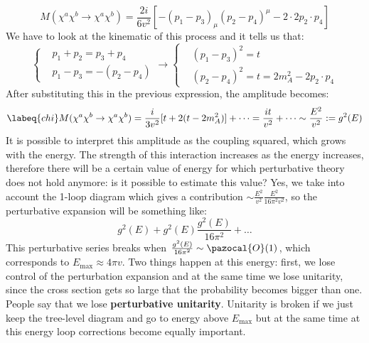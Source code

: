 \documentclass[../main.tex]{subfiles}
\begin{document}
\[
M(\chi^a\chi^b\to\chi^a\chi^b)=\frac{2i}{6v^2}[-(p_1-p_3)_\mu(p_2-p_4)^\mu-2\cdot2p_2\cdot p_4]
\]
We have to look at the kinematic of this process and it tells us that:
\[
\left\{
\begin{aligned}
&p_1+p_2=p_3+p_4\\
&p_1-p_3=-(p_2-p_4)
\end{aligned}
\right.
\to
\left\{
\begin{aligned}
&(p_1-p_3)^2=t\\
&(p_2-p_4)^2=t=2m_A^2-2p_2\cdot p_4
\end{aligned}
\right.
\]
After substituting this in the previous expression, the amplitude becomes:
\begin{equation}
\labeq{chi}
M(\chi^a\chi^b\to\chi^a\chi^b)=\frac{i}{3v^2}[t+2(t-2m_A^2)]+\dots=\frac{it}{v^2}+\dots\sim\frac{E^2}{v^2}:=g^2(E)
\end{equation}
It is possible to interpret this amplitude as the coupling squared, which grows with the energy. The strength of this interaction increases as the energy increases, therefore there will be a certain value of energy for which perturbative theory does not hold anymore: is it possible to estimate this value? Yes, we take into account the 1-loop diagram  which gives a contribution $\sim\frac{E^2}{v^2}\frac{E^2}{16\pi^2v^2}$, so the perturbative expansion will be something like:
\[
g^2(E)+g^2(E)\frac{g^2(E)}{16\pi^2}+\dots
\]
This perturbative series breaks when $\frac{g^2(E)}{16\pi^2}\sim\pazocal{O}(1)$, which corresponds to $E_{\text{max}}\approx4\pi v$. Two things happen at this energy: first, we lose control of the perturbation expansion and at the same time we lose unitarity, since the cross section gets so large that the probability becomes bigger than one. People say that we lose \textbf{perturbative unitarity}. Unitarity is broken if we just keep the tree-level diagram and go to energy above $E_{\text{max}}$ but at the same time at this energy loop corrections become equally important. 
\end{document}
